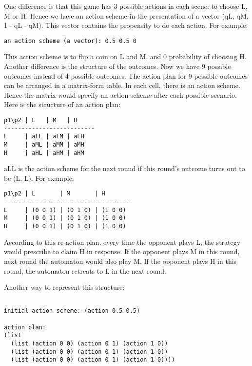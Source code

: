 \documentclass[12.5pt]{report}
\begin{document}
One difference is that this game has 3 possible actions in each scene: to choose L, M or H. Hence we have an action scheme in the presentation of a vector (qL, qM, 1 - qL - qM). This vector contains the propensity to do each action. For example:

\begin{verbatim}
an action scheme (a vector): 0.5 0.5 0
\end{verbatim}

This action scheme is to flip a coin on L and M, and 0 probability of choosing H.\\

Another difference is the structure of the outcomes. Now we have 9 possible outcomes instead of 4 possible outcomes. The action plan for 9 possible outcomes can be arranged in a matrix-form table. In each cell, there is an action scheme. Hence the matrix would specify an action scheme after each possible scenario. Here is the structure of an action plan:

\begin{verbatim}
p1\p2 | L   | M   | H
--------------------------
L     | aLL | aLM | aLH
M     | aML | aMM | aMH
H     | aHL | aHM | aHM

\end{verbatim}

aLL is the action scheme for the next round if this round's outcome turns out to be (L, L). For example:

\begin{verbatim}
p1\p2 | L       | M       | H
-------------------------------------
L     | (0 0 1) | (0 1 0) | (1 0 0)
M     | (0 0 1) | (0 1 0) | (1 0 0)
H     | (0 0 1) | (0 1 0) | (1 0 0)

\end{verbatim}


According to this re-action plan, every time the opponent plays L, the strategy would prescribe to claim H in response. If the opponent plays M in this round, next round the automaton would also play M. If the opponent plays H in this round, the automaton retreats to L in the next round.

Another way to represent this structure:
\begin{verbatim}

initial action scheme: (action 0.5 0.5)

action plan:
(list
  (list (action 0 0) (action 0 1) (action 1 0))
  (list (action 0 0) (action 0 1) (action 1 0))
  (list (action 0 0) (action 0 1) (action 1 0))))


\end{verbatim}
\end{document}
